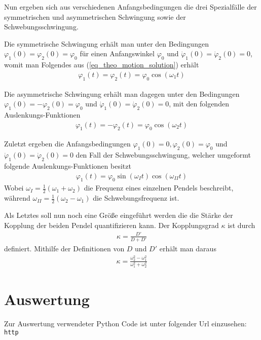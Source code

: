 \documentclass[12pt,a4paper,german]{scrartcl}
\numberwithin{equation}{section}
\begin{document}
  Nun ergeben sich aus verschiedenen Anfangsbedingungen die drei Spezialfälle der symmetrischen und asymmetrischen Schwingung sowie der Schwebungsschwingung.

  Die symmetrische Schwingung erhält man unter den Bedingungen $\varphi_1(0) = \varphi_2(0) = \varphi_0$ für einen Anfangswinkel $\varphi_0$ und $\dot{\varphi}_1(0) = \dot{\varphi}_2(0) = 0$, womit man Folgendes aus (\ref{eq_theo_motion_solution}) erhält
  \begin{align}
    \varphi_1(t) = \varphi_2(t) = \varphi_0 \cos(\omega_1 t)
    \label{eq_theo_motion_solution_sym}
  \end{align}

  Die asymmetrische Schwingung erhält man dagegen unter den Bedingungen $\varphi_1(0) = -\varphi_2(0) = \varphi_0$ und $\dot{\varphi}_1(0) = \dot{\varphi}_2(0) = 0$, mit den folgenden Auslenkungs-Funktionen
  \begin{align}
    \varphi_1(t) = -\varphi_2(t) = \varphi_0 \cos(\omega_2 t)
    \label{eq_theo_motion_solution_asym}
  \end{align}

  Zuletzt ergeben die Anfangsbedingungen $\varphi_1(0) = 0, \varphi_2(0) = \varphi_0$ und $\dot{\varphi}_1(0) = \dot{\varphi}_2(0) = 0$ den Fall der Schwebungsschwingung, welcher umgeformt folgende Auslenkungs-Funktionen besitzt
  \begin{align}
    \varphi_1(t) = \varphi_0 \sin(\omega_I t) \cos(\omega_{II} t)
    \label{eq_theo_motion_solution_beats}
  \end{align}
  Wobei $\omega_I = \frac{1}{2}(\omega_1 + \omega_2)$ die Frequenz eines einzelnen Pendels beschreibt, während $\omega_{II} = \frac{1}{2}(\omega_2 - \omega_1)$ die Schwebungsfrequenz ist.

  Als Letztes soll nun noch eine Größe eingeführt werden die die Stärke der Kopplung der beiden Pendel quantifizieren kann. Der Kopplungsgrad $\kappa$ ist durch
  \begin{align}
    \kappa = \frac{D'}{D + D'}
    \label{eq_theo_coupling_factor}
  \end{align}
  definiert. Mithilfe der Definitionen von $D$ und $D'$ erhält man daraus
  \begin{align}
    \kappa = \frac{\omega_2^2 - \omega_1^2}{\omega_1^2 + \omega_2^2}
    \label{eq_theo_coupling_factor_with_omega}
  \end{align}


  \section{Auswertung}
  Zur Auswertung verwendeter Python Code ist unter folgender Url einzusehen: \texttt{http}
\end{document}

